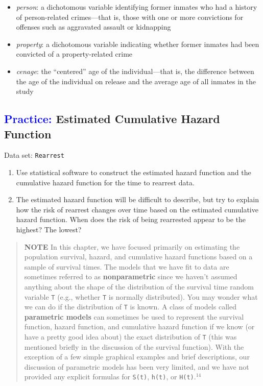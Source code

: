 \documentclass[
]{report}
\begin{document}
\begin{itemize}
\item
  \emph{person}: a dichotomous variable identifying former inmates who had a history of person-related crimes---that is, those with one or more convictions for offenses such as aggravated assault or kidnapping
\item
  \emph{property}: a dichotomous variable indicating whether former inmates had been convicted of a property-related crime
\item
  \emph{cenage}: the ``centered'' age of the individual---that is, the difference between the age of the individual on release and the average age of all inmates in the study
\end{itemize}

\hypertarget{estimated-cumulative-hazard-function-1}{%
\subsection*{\texorpdfstring{\textcolor{blue}{Practice:} Estimated Cumulative Hazard Function}{ Estimated Cumulative Hazard Function}}\label{estimated-cumulative-hazard-function-1}}

Data set: \texttt{Rearrest}

\begin{enumerate}
\def\labelenumi{\arabic{enumi}.}
\setcounter{enumi}{48}
\item
  Use statistical software to construct the estimated hazard function and the cumulative hazard function for the time to rearrest data.
\item
  The estimated hazard function will be difficult to describe, but try to explain how the risk of rearrest changes over time based on the estimated cumulative hazard function. When does the risk of being rearrested appear to be the highest? The lowest?
\end{enumerate}

\begin{quote}
\textbf{NOTE}
In this chapter, we have focused primarily on estimating the population survival, hazard, and cumulative hazard functions based on a sample of survival times. The models that we have fit to data are sometimes referred to as \textbf{nonparametric} since we haven't assumed anything about the shape of the distribution of the survival time random variable \texttt{T} (e.g., whether \texttt{T} is normally distributed). You may wonder what we can do if the distribution of \texttt{T} is known. A class of models called \textbf{parametric models} can sometimes be used to represent the survival function, hazard function, and cumulative hazard function if we know (or have a pretty good idea about) the exact distribution of \texttt{T} (this was mentioned briefly in the discussion of the survival function). With the exception of a few simple graphical examples and brief descriptions, our discussion of parametric models has been very limited, and we have not provided any explicit formulas for \texttt{S(t)}, \texttt{h(t)}, or \texttt{H(t)}.\(^{14}\)
\end{quote}
\end{document}
